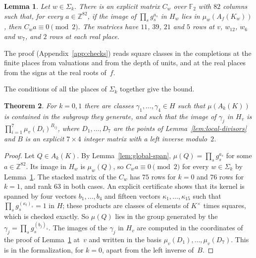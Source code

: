 \documentclass[11pt]{amsart}
\newtheorem{theorem}{Theorem}[section]
\newtheorem{lemma}[theorem]{Lemma}
\theoremstyle{definition}
\numberwithin{equation}{section}
\newcommand{\Z}{\mathbb{Z}}
\newcommand{\F}{\mathbb{F}}
\newcommand{\lean}[1]{\ignorespaces}
\begin{document}
\begin{lemma}\label{lem:local-images}\lean{FurioLombardo.Discharge.SelmerBasis.V.coordCond_v, FurioLombardo.Discharge.SelmerBasis.V.imageIn_v, FurioLombardo.Discharge.SelmerBasis.W2.coordCond_w2, FurioLombardo.Discharge.SelmerBasis.W3.coordCond_w3, FurioLombardo.Discharge.SelmerBasis.W3.imageIn_w3, FurioLombardo.Discharge.SelmerBasis.W7.coordCond_w7, FurioLombardo.Discharge.SelmerBasis.RealRoots.coordCond_place, FurioLombardo.Discharge.SelmerBasis.RealRoots.signOK, FurioLombardo.Discharge.SelmerBasis.RealRoots.imageIn_place}
Let $w\in\Sigma_k$. There is an explicit matrix $C_w$ over $\F_2$ with $82$ columns such that, for every $a\in\Z^{82}$, if the image of $\prod_sg_s^{a_s}$ in $H_w$ lies in $\mu_w(A_f(K_w))$, then $C_wa\equiv0\pmod2$. The matrices have $11$, $39$, $21$ and $5$ rows at $v$, $w_{12}$, $w_6$ and $w_7$, and $2$ rows at each real place.
\end{lemma}

The proof (Appendix~\ref{app:checks}) reads square classes in the completions at the finite places from valuations and from the depth of units, and at the real places from the signs at the real roots of~$f$.

The conditions of all the places of $\Sigma_k$ together give the bound.

\begin{theorem}\label{thm:selmer-basis}\lean{FurioLombardo.Discharge.SelmerBasis.Assembly.selmerBasis_0, FurioLombardo.Discharge.SelmerBasis.Assembly.selmerBasis_1, FurioLombardo.M4.T0.hSBL, FurioLombardo.M4.T1.hSBL}
For $k=0,1$ there are classes $\gamma_1,\dots,\gamma_4\in H$ such that $\mu(A_k(K))$ is contained in the subgroup they generate, and such that the image of $\gamma_j$ in $H_v$ is $\prod_{i=1}^7\mu_v(D_i)^{B_{ij}}$, where $D_1,\dots,D_7$ are the points of Lemma~\ref{lem:local-divisors} and $B$ is an explicit $7\times4$ integer matrix with a left inverse modulo~$2$.
\end{theorem}

\begin{proof}
Let $Q\in A_k(K)$. By Lemma~\ref{lem:global-span}, $\mu(Q)=\prod_sg_s^{a_s}$ for some $a\in\Z^{82}$. Its image in $H_w$ is $\mu_w(Q)$, so $C_wa\equiv0\pmod2$ for every $w\in\Sigma_k$ by Lemma~\ref{lem:local-images}. The stacked matrix of the $C_w$ has $75$ rows for $k=0$ and $76$ rows for $k=1$, and rank $63$ in both cases. An explicit certificate shows that its kernel is spanned by four vectors $b_1,\dots,b_4$ and fifteen vectors $\kappa_1,\dots,\kappa_{15}$ such that $\prod_sg_s^{(\kappa_l)_s}=1$ in $H$; these products are classes of elements of $K^\times$ times squares, which is checked exactly. So $\mu(Q)$ lies in the group generated by the $\gamma_j=\prod_sg_s^{(b_j)_s}$. The images of the $\gamma_j$ in $H_v$ are computed in the coordinates of the proof of Lemma~\ref{lem:local-images} at~$v$ and written in the basis $\mu_v(D_1),\dots,\mu_v(D_7)$. This is  in the formalization, for $k=0$, apart from the left inverse of~$B$.
\end{proof}
\end{document}
